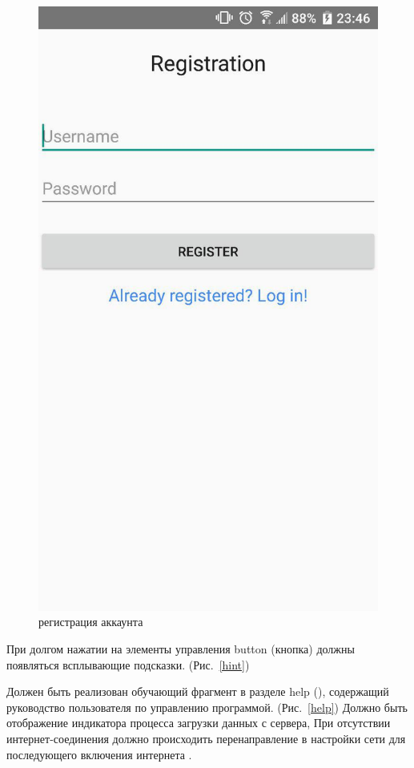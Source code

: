 \begin{figure}[h!]
    \includegraphics[height=0.42\textheight]{./screenshots/3/register.jpg}
    \caption{\small{регистрация аккаунта}}
    \label{register}
    \endminipage{}
\end{figure}


При долгом нажатии на элементы
управления button (кнопка) должны появляться всплывающие подсказки. (Рис.~\ref{hint})

Должен быть реализован обучающий фрагмент в разделе help (), содержащий руководство
пользователя по управлению программой. (Рис.~\ref{help})
Должно быть отображение индикатора процесса загрузки данных с сервера,
При отсутствии интернет-соединения должно происходить перенаправление в настройки сети для
последующего включения интернета .

